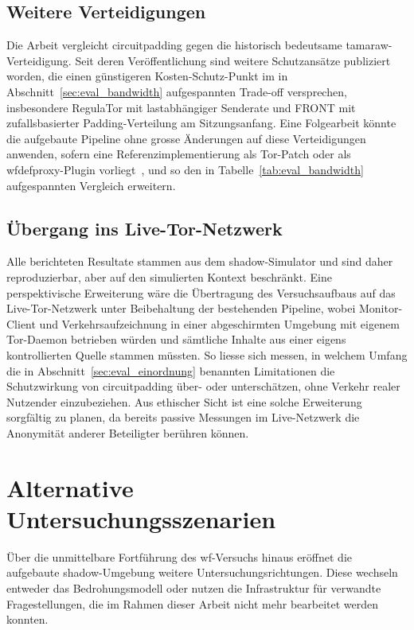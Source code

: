 \subsection{Weitere Verteidigungen}
\label{sec:ausblick_defenses}

Die Arbeit vergleicht \gls{circuitpadding} gegen die historisch bedeutsame \gls{tamaraw}-Verteidigung.
Seit deren Veröffentlichung sind weitere Schutzansätze publiziert worden, die einen günstigeren Kosten-Schutz-Punkt im in Abschnitt~\ref{sec:eval_bandwidth} aufgespannten Trade-off versprechen, insbesondere RegulaTor mit lastabhängiger Senderate und FRONT mit zufallsbasierter Padding-Verteilung am Sitzungsanfang.
Eine Folgearbeit könnte die aufgebaute Pipeline ohne grosse Änderungen auf diese Verteidigungen anwenden, sofern eine Referenzimplementierung als Tor-Patch oder als wfdefproxy-Plugin vorliegt~\cite{wfdefproxy}, und so den in Tabelle~\ref{tab:eval_bandwidth} aufgespannten Vergleich erweitern.

\subsection{Übergang ins Live-Tor-Netzwerk}
\label{sec:ausblick_live}

Alle berichteten Resultate stammen aus dem \gls{shadow}-Simulator und sind daher reproduzierbar, aber auf den simulierten Kontext beschränkt.
Eine perspektivische Erweiterung wäre die Übertragung des Versuchsaufbaus auf das Live-Tor-Netzwerk unter Beibehaltung der bestehenden Pipeline, wobei Monitor-Client und Verkehrsaufzeichnung in einer abgeschirmten Umgebung mit eigenem Tor-Daemon betrieben würden und sämtliche Inhalte aus einer eigens kontrollierten Quelle stammen müssten.
So liesse sich messen, in welchem Umfang die in Abschnitt~\ref{sec:eval_einordnung} benannten Limitationen die Schutzwirkung von \gls{circuitpadding} über- oder unterschätzen, ohne Verkehr realer Nutzender einzubeziehen.
Aus ethischer Sicht ist eine solche Erweiterung sorgfältig zu planen, da bereits passive Messungen im Live-Netzwerk die Anonymität anderer Beteiligter berühren können.

\section{Alternative Untersuchungsszenarien}
\label{sec:ausblick_alternativen}

Über die unmittelbare Fortführung des \gls{wf}-Versuchs hinaus eröffnet die aufgebaute \gls{shadow}-Umgebung weitere Untersuchungsrichtungen.
Diese wechseln entweder das Bedrohungsmodell oder nutzen die Infrastruktur für verwandte Fragestellungen, die im Rahmen dieser Arbeit nicht mehr bearbeitet werden konnten.

